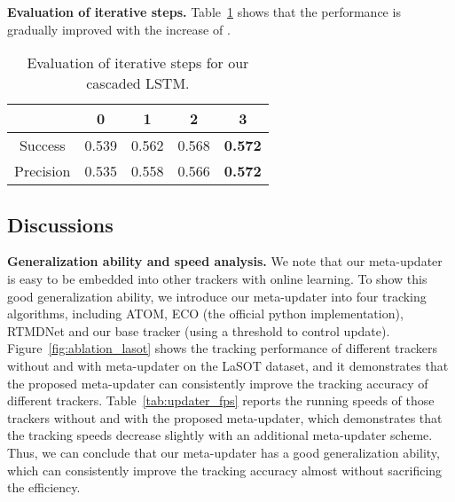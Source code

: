 \documentclass[10pt,twocolumn,letterpaper]{article}
\begin{document}
\noindent \textbf{Evaluation of iterative steps.}
Table~\ref{tab:ablationk} shows that the performance is gradually improved with the increase of .

\begin{table}[h]
\vspace{-2mm}
\caption{Evaluation of iterative steps for our cascaded LSTM.}
\vspace{-3mm}
\small
\label{tab:ablationk}
\begin{center}
\begin{tabular}{ccccc}
\hline
         & 0     & 1     & 2    & 3                                     \\
\hline
Success      & 0.539 & 0.562 & {\color[HTML]{000000} 0.568} & {\color[HTML]{FE0000} \textbf{0.572}} \\
Precision    & 0.535 & 0.558 & {\color[HTML]{000000} 0.566} & {\color[HTML]{FE0000} \textbf{0.572}}\\
\hline
\end{tabular}
\end{center}
\vspace{-8mm}
\end{table}

\subsection{Discussions}
\vspace{-2mm}
\label{sec-ga}
\noindent \textbf{Generalization ability and speed analysis.} We note that our meta-updater is easy to be embedded
into other trackers with online learning. To show this good generalization ability, we introduce our meta-updater into
four tracking algorithms, including ATOM, ECO (the official python implementation), RTMDNet and our base tracker
(using a threshold to control update).
Figure~\ref{fig:ablation_lasot} shows the tracking performance of different trackers without and with meta-updater
on the LaSOT dataset, and it demonstrates that the proposed meta-updater can consistently improve the tracking
accuracy of different trackers.
Table~\ref{tab:updater_fps} reports the running speeds of those trackers without and with the proposed meta-updater,
which demonstrates that the tracking speeds decrease slightly with an additional meta-updater scheme.
Thus, we can conclude that our meta-updater has a good generalization ability, which can consistently improve
the tracking accuracy almost without sacrificing the efficiency.
\end{document}
